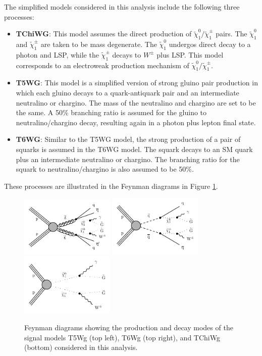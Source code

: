 \documentclass[thesis.tex]{subfiles}
\begin{document}
The simplified models considered in this analysis include the following three processes: 
	\begin{itemize}
		\item \textbf{TChiWG}: This model assumes the direct production of $\tilde{\chi}_1^0/\tilde{\chi}_1^\pm$ pairs. The $\tilde{\chi}_1^0$ and $\tilde{\chi}_1^\pm$ are taken to be mass degenerate. The $\tilde{\chi}_1^0$ undergos direct decay to a photon and LSP, while the $\tilde{\chi}_1^\pm$ decays to $W^\pm$ plus LSP. This model corresponds to an electroweak production mechanism of $\tilde{\chi}_1^0/\tilde{\chi}_1^\pm$.  
		\item  \textbf{T5WG}: This model is a simplified version of strong gluino pair production in which each gluino decays to a quark-antiquark pair and an intermediate neutralino or chargino. The mass of the neutralino and chargino are set to be the same. A 50\% branching ratio is assumed for the gluino to neutralino/chargino decay, resulting again in a photon plus lepton final state. 
		\item \textbf{T6WG}: Similar to the T5WG model, the strong production of a pair of squarks is assumed in the T6WG model. The squark decays to an SM quark plus an intermediate neutralino or chargino. The branching ratio for the squark to neutralino/chargino is also assumed to be 50\%. 
	\end{itemize}
These processes are illustrated in the Feynman diagrams in Figure \ref{fig:feyngmsb}.

	\begin{figure}[!h]
	\centering
		\includegraphics[width=0.4\textwidth]{plot/gitT5qqqqWG.pdf}
		\includegraphics[width=0.4\textwidth]{plot/gitT6qqWG.pdf}  \\
		\includegraphics[width=0.4\textwidth]{plot/gitTChiGW.pdf} 
	\caption{Feynman diagrams showing the production and decay modes of the signal models T5Wg (top left), T6Wg (top right), and TChiWg (bottom) considered in this analysis.}
	\label{fig:feyngmsb}
	\end{figure}
\end{document}
